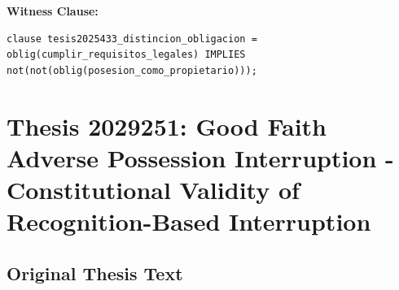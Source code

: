 \documentclass[11pt,a4paper]{article}
\begin{document}
\textbf{Witness Clause:}

\begin{lstlisting}[style=witnessstyle, language=Witness]
clause tesis2025433_distincion_obligacion = oblig(cumplir_requisitos_legales) IMPLIES not(not(oblig(posesion_como_propietario)));
\end{lstlisting}

\newpage

\section{Thesis 2029251: Good Faith Adverse Possession Interruption - Constitutional Validity of Recognition-Based Interruption}
\label{thesis:2029251}

\subsection{Original Thesis Text}
\end{document}
